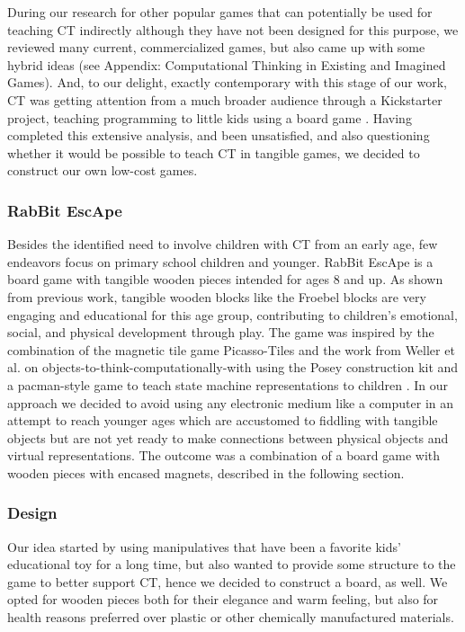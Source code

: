 \documentclass{acm_proc_article-sp}
\begin{document}
During our research for other popular games that can potentially be used for teaching CT indirectly although they have not been designed for this purpose, we reviewed many current, commercialized games, but also came up with some hybrid ideas (see Appendix: Computational Thinking in Existing and Imagined Games). And, to our delight, exactly contemporary with this stage of our work, CT was getting attention from a much broader audience through a Kickstarter project, teaching programming to little kids using a board game \cite{robotturtles}. Having completed this extensive analysis, and been unsatisfied, and also questioning whether it would be possible to teach CT in tangible games, we decided to construct our own low-cost games.

\subsubsection{RabBit EscApe}
Besides the identified need to involve children with CT from an early age, few endeavors focus on primary school children and younger. RabBit EscApe is a board game with tangible wooden pieces intended for ages 8 and up. As shown from previous work, tangible wooden blocks like the Froebel blocks\cite{liebschner1992child} are very engaging and educational for this age group, contributing to children's emotional, social, and physical development through play. The game was inspired by the combination of the magnetic tile game Picasso-Tiles\cite{picassotiles3d} and the work from Weller et al. on objects-to-think-computationally-with using the Posey construction kit and a pacman-style game to teach state machine representations to children \cite{weller2008escape}. In our approach we decided to avoid using any electronic medium like a computer in an attempt to reach younger ages which are accustomed to fiddling with tangible objects but are not yet ready to make connections between physical objects and virtual representations. The outcome was a combination of a board game with wooden pieces with encased magnets, described in the following section.

\subsubsection{Design}
Our idea started by using manipulatives that have been a favorite kids' educational toy for a long time, but also wanted to provide some structure to the game to better support CT, hence we decided to construct a board, as well. We opted for wooden pieces both for their elegance and warm feeling, but also for health reasons preferred over plastic or other chemically manufactured materials. 
\end{document}
